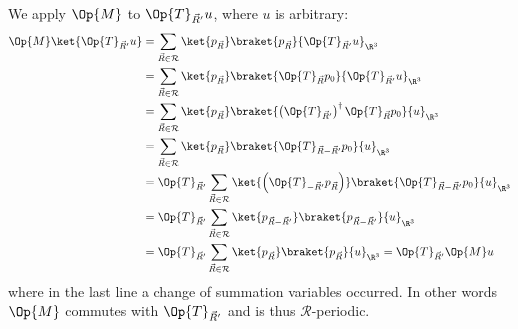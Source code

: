 \documentclass{MFHarticle}
\begin{document}
We apply $\Op{M}$ to $\Op{T}_{\vec{R}'} u$, where $u$ is arbitrary:
\begin{align*}
\Op{M} \ket{\Op{T}_{\vec{R}'} u}
&= \sum_{\vec{R} \in \mathcal{R}}
\ket{p_{\vec{R}}} \braket{p_{\vec{R}}}{\Op{T}_{\vec{R}'} u}_{\R^3} \\
&= \sum_{\vec{R} \in \mathcal{R}} \ket{p_{\vec{R}}}
\braket{\Op{T}_{\vec{R}} p_0}{\Op{T}_{\vec{R}'} u}_{\R^3} \\
&= \sum_{\vec{R} \in \mathcal{R}} \ket{p_{\vec{R}}}
\braket{\left( \Op{T}_{\vec{R}'} \right)^\dagger \Op{T}_{\vec{R}} p_0}{u}_{\R^3} \\
&= \sum_{\vec{R} \in \mathcal{R}} \ket{p_{\vec{R}}}
\braket{\Op{T}_{\vec{R} - \vec{R}'} p_0}{u}_{\R^3} \\
&= \Op{T}_{\vec{R}'} \sum_{\vec{R} \in \mathcal{R}}
\ket{\left(\Op{T}_{-\vec{R}'} p_{\vec{R}}\right)}
\braket{\Op{T}_{\vec{R} - \vec{R}'} p_0}{u}_{\R^3} \\
&= \Op{T}_{\vec{R}'} \sum_{\vec{R} \in \mathcal{R}}
\ket{p_{\vec{R}- \vec{R}'}} \braket{p_{\vec{R}- \vec{R}'}}{u}_{\R^3} \\
&= \Op{T}_{\vec{R}'} \sum_{\vec{R} \in \mathcal{R}}
\ket{p_{\vec{R}}} \braket{p_{\vec{R}}}{u}_{\R^3} = \Op{T}_{\vec{R}'} \Op{M} u
\end{align*}
where in the last line a change of summation variables occurred.
In other words $\Op{M}$ commutes with $\Op{T}_{\vec{R}'}$
and is thus $\mathcal{R}$-periodic.
\end{document}
